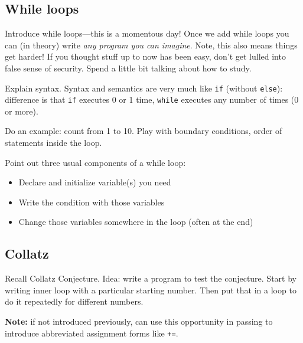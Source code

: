 \documentclass{article}
\newcommand{\notready}{\textcolor{red}{\XSolidBold}\xspace}
\newcommand{\shortdayname}{%
  \ifthenelse{\equal{\datedayname}{Thursday}}{Th}{\StrLeft{\datedayname}{1}}}
\newcommand{\shortmonthname}{\StrLeft{\datemonthname}{3}}
\newcommand{\showdate}{\thedateday\ \shortmonthname}
\newcommand{\showdowdate}{\shortdayname\ \showdate}
\newcommand{\advanceMWF}{
  \ifthenelse{\equal{\datedayname}{Monday}}
  {\nextdate\nextdate}
  {\ifthenelse{\equal{\datedayname}{Wednesday}}
    {\nextdate\nextdate}
    {\ifthenelse{\equal{\datedayname}{Thursday}}
      {\nextdate}
      {\nextdate\nextdate\nextdate}}}}
\newcommand{\firstclass}[1]{\section*{#1 (\showdowdate)}}
\newcommand{\class}[1]{\advanceMWF\firstclass{#1}}
\begin{document}
\subsection*{While loops}

Introduce while loops---this is a momentous day!  Once we add while
loops you can (in theory) write \emph{any program you can imagine}.
Note, this also means things get harder!  If you thought stuff up to
now has been easy, don't get lulled into false sense of security. Spend
a little bit talking about how to study.

Explain syntax.  Syntax and semantics are very much like \verb|if|
(without \verb|else|): difference is that \verb|if| executes 0 or 1
time, \verb|while| executes any number of times (0 or more).

Do an example: count from 1 to 10.  Play with boundary conditions,
order of statements inside the loop.



Point out three usual components of a while loop:
\begin{itemize}
\item Declare and initialize variable(s) you need
\item Write the condition with those variables
\item Change those variables somewhere in the loop (often at the
  end)
\end{itemize}

\subsection*{Collatz}

Recall Collatz Conjecture.  Idea: write a program to test the
conjecture.  Start by writing inner loop with a particular starting
number.  Then put that in a loop to do it repeatedly for different
numbers.

\textbf{Note:} if not introduced previously, can use this opportunity
in passing to introduce abbreviated assignment forms like \verb|+=|.
\end{document}
